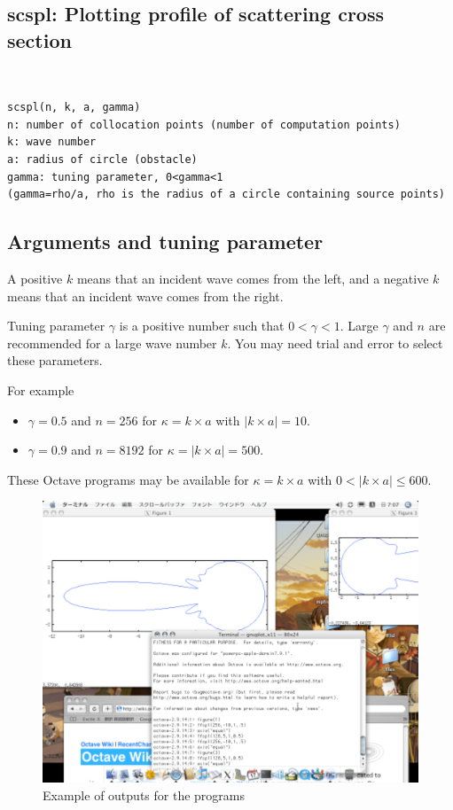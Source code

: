 \documentclass[12pt]{article}
\begin{document}
\subsection{scspl: Plotting profile of scattering cross section}
{\tt
\begin{verbatim}
scspl(n, k, a, gamma)
n: number of collocation points (number of computation points)
k: wave number
a: radius of circle (obstacle)
gamma: tuning parameter, 0<gamma<1
(gamma=rho/a, rho is the radius of a circle containing source points)
\end{verbatim}
}

\subsection{Arguments and tuning parameter}
A positive $k$ means that an incident wave comes from the left, and a negative $k$ means that an incident wave comes from the right.

Tuning parameter $\gamma$ is a positive number such that $0<\gamma<1$.
Large $\gamma$ and $n$ are recommended for a large wave number $k$.
You may need trial and error to select these parameters.

For example
\begin{itemize}
\item $\gamma=0.5$ and $n=256$ for $\kappa=k\times a$ with $|k\times a|=10$.
\item $\gamma=0.9$ and $n=8192$ for $\kappa=|k\times a|=500$.
\end{itemize}

These Octave programs may be available for $\kappa=k\times a$ with $0<|k\times a| \le 600$.

\begin{figure}[p]
\begin{center}
\includegraphics[scale=0.7]{./ffc1.eps}
\caption{Example of outputs for the programs}
\label{outputs}
\end{center}
\end{figure}
\end{document}

